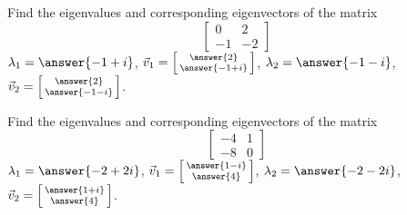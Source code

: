 \documentclass{ximera}
\begin{document}
\begin{exercise}%
    Find the eigenvalues and corresponding eigenvectors of the matrix 
    \[ 
        \begin{bmatrix} 
        0 & 2 \\ 
        -1 & -2 
        \end{bmatrix} 
    \]
    $\lambda_1 = \answer{-1+i}$, $\vec{v}_1 = \left[\begin{smallmatrix} \answer{2} \\ \answer{-1+i} \end{smallmatrix}\right]$, $\lambda_2 = \answer{-1-i}$, $\vec{v}_2 = \left[\begin{smallmatrix} \answer{2} \\ \answer{-1-i} \end{smallmatrix}\right]$. 
\end{exercise}

\begin{exercise}%
    Find the eigenvalues and corresponding eigenvectors of the matrix 
    \[ 
        \begin{bmatrix} 
        -4 & 1 \\ 
        -8 & 0 
        \end{bmatrix} 
    \]
    $\lambda_1 = \answer{-2+2i}$, $\vec{v}_1 = \left[\begin{smallmatrix} \answer{1-i} \\ \answer{4} \end{smallmatrix}\right]$, $\lambda_2 = \answer{-2-2i}$, $\vec{v}_2 = \left[\begin{smallmatrix} \answer{1+i}\\ \answer{4} \end{smallmatrix}\right]$. 
\end{exercise}
\end{document}
